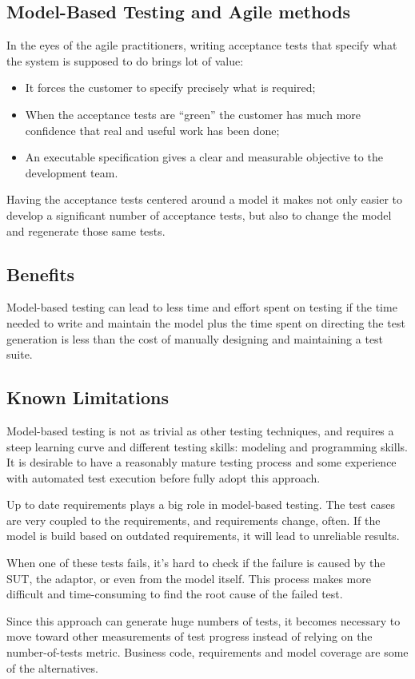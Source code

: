 \subsection{Model-Based Testing and Agile methods}
In the eyes of the agile practitioners, writing acceptance tests
that specify what the system is supposed to do brings lot of value:
\begin{itemize}
\item It forces the customer to specify precisely what is required;
\item When the acceptance tests are “green” the customer has much 
more confidence that real and useful work has been done;
\item An executable specification gives a clear and measurable 
objective to the development team.
\end{itemize}

Having the acceptance tests centered around a model it makes 
not only easier to develop a significant number of acceptance tests,
but also to change the model and regenerate those same tests.

\subsection{Benefits}
Model-based testing can lead to less time and effort spent
on testing if the time needed to write and maintain the model 
plus the time spent on directing the test generation is less 
than the cost of manually designing and maintaining a test suite.

\subsection{Known Limitations}
Model-based testing is not as trivial as other testing techniques,
and requires a steep learning curve and different testing 
skills: modeling and programming skills. It is desirable to have 
a reasonably mature testing process and some experience with 
automated test execution before fully adopt this approach.

Up to date requirements plays a big role in model-based testing.
The test cases are very coupled to the requirements, and
requirements change, often. If the model is build based on outdated
requirements, it will lead to unreliable results. 

When one of these tests
fails, it's hard to check if the failure is caused by the SUT, the
adaptor, or even from the model itself. This process makes more
difficult and time-consuming to find the root cause of the failed test.

Since this approach can generate huge numbers of tests, it becomes
necessary to move toward other measurements of test progress instead
of relying on the number-of-tests metric. Business code, requirements and model
coverage are some of the alternatives.
